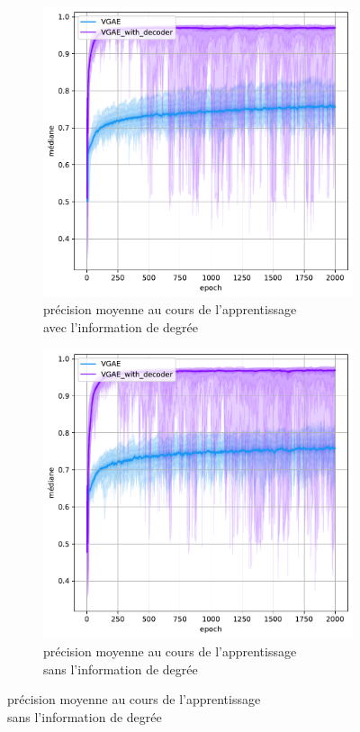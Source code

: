 \documentclass{article}
\begin{document}
\begin{figure}[H]
    \centering
    \captionsetup{justification=centering}
    \begin{subfigure}{0.45\textwidth}
      \includegraphics[width=\textwidth]{graphics/APs_degree_decoder_cinf.svg.pdf}
      \centering
      \caption{précision moyenne au cours de l'apprentissage\\ avec l'information de degrée}
    \end{subfigure}
    \begin{subfigure}{0.45\textwidth}
      \includegraphics[width=\textwidth]{graphics/APs_no_degree_decoder_cinf.svg.pdf}
      \centering
      \caption{précision moyenne au cours de l'apprentissage\\ sans l'information de degrée}
    \end{subfigure}
    

\end{figure}
\end{document}
